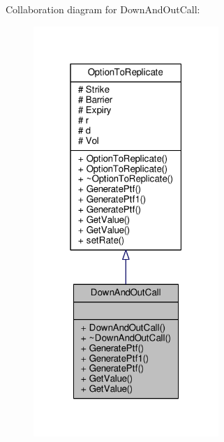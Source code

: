 Collaboration diagram for Down\+And\+Out\+Call\+:
\nopagebreak
\begin{figure}[H]
\begin{center}
\leavevmode
\includegraphics[width=199pt]{classDownAndOutCall__coll__graph}
\end{center}
\end{figure}
